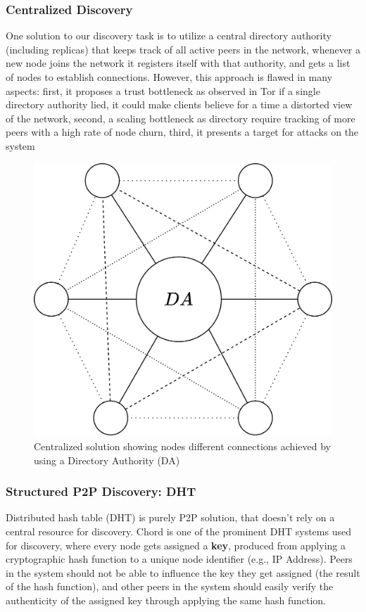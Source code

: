 \documentclass[12pt,twocolumn]{article}
\begin{document}
\subsubsection{Centralized Discovery}
One solution to our discovery task is to utilize a central directory authority (including replicas) \cite{bittorrent, tor:directory_spec}
that keeps track of all active peers in the network, whenever a new node joins the network it registers itself with that authority,
and gets a list of nodes to establish connections. However, this approach is flawed in many aspects: first, 
it proposes a trust bottleneck as observed in Tor \cite{tor:directory_spec}
if a single directory authority lied, it could make clients believe for a time a distorted view of the network,
second, a scaling bottleneck as directory require tracking of more peers with a high rate of node churn,
third, it presents a target for attacks on the system \cite{tor:censor, egypt:censor}
\begin{figure}[h]
    \includegraphics[width=\linewidth]{fig/p2p_report.png}
    \caption{Centralized solution showing nodes different connections achieved by using a Directory Authority (DA)}
\end{figure}

\subsubsection{Structured P2P Discovery: DHT \label{DHT}}
Distributed hash table (DHT) is purely P2P solution, that doesn't rely on a central resource for discovery.
Chord \cite{chord} is one of the prominent DHT systems used for discovery, where every node gets assigned a \textbf{key},
produced from applying a cryptographic hash function to a unique node identifier (e.g., IP Address). Peers in the system 
should not be able to influence the key they get assigned (the result of the hash function), and other peers in the system
should easily verify the authenticity of the assigned key through applying the same hash function. 
\end{document}
